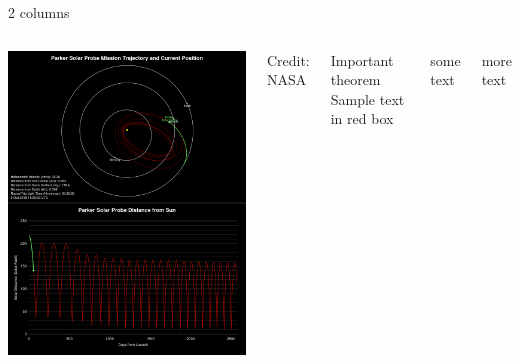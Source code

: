 \documentclass[10pt]{beamer}	%
\begin{document}
\begin{frame}[plain,t]{}{2 columns}
	\begin{columns}[t]	%
	
		\includegraphics[width=\textwidth]{figures/psp201810_0204.png}

		
		\hfill {\scriptsize Credit: NASA}
		
	
		\begin{alertblock}{Important theorem}
			Sample text in red box
		\end{alertblock}

		some text
		
		more text
	\end{columns}
\end{frame}
\end{document}
